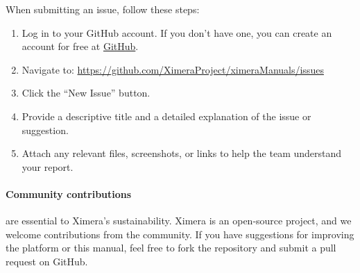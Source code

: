 \documentclass{ximera}
\begin{document}
When submitting an issue, follow these steps:
\begin{enumerate}
    \item Log in to your GitHub account. If you don't have one, you can create
          an account for free at \href{https://github.com}{GitHub}.
    \item Navigate to:
          \url{https://github.com/XimeraProject/ximeraManuals/issues}
    \item Click the ``New Issue'' button.
    \item Provide a descriptive title and a detailed explanation of the issue
          or suggestion.
    \item Attach any relevant files, screenshots, or links to help the team
          understand your report.
\end{enumerate}

\paragraph{Community contributions} are essential to Ximera's sustainability.
Ximera is an open-source project, and we welcome contributions from the
community. If you have suggestions for improving the platform or this manual,
feel free to fork the repository and submit a pull request on GitHub.
\end{document}
